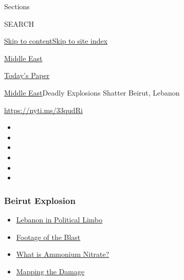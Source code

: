 Sections

SEARCH

\protect\hyperlink{site-content}{Skip to
content}\protect\hyperlink{site-index}{Skip to site index}

\href{https://www.nytimes3xbfgragh.onion/section/world/middleeast}{Middle
East}

\href{https://myaccount.nytimes3xbfgragh.onion/auth/login?response_type=cookie\&client_id=vi}{}

\href{https://www.nytimes3xbfgragh.onion/section/todayspaper}{Today's
Paper}

\href{/section/world/middleeast}{Middle East}\textbar{}Deadly Explosions
Shatter Beirut, Lebanon

\url{https://nyti.ms/33qudRi}

\begin{itemize}
\item
\item
\item
\item
\item
\item
\end{itemize}

\hypertarget{beirut-explosion}{%
\subsubsection{Beirut Explosion}\label{beirut-explosion}}

\begin{itemize}
\tightlist
\item
  \href{https://www.nytimes3xbfgragh.onion/2020/08/11/world/middleeast/lebanon-government-resigns-explainer.html?name=styln-beirut\&region=TOP_BANNER\&block=storyline_menu_recirc\&action=click\&pgtype=Article\&impression_id=b4d6dc20-f1c6-11ea-ab9d-b3a5fe44f351\&variant=undefined}{Lebanon
  in Political Limbo}
\item
  \href{https://www.nytimes3xbfgragh.onion/2020/08/05/world/middleeast/beirut-explosion-footage.html?name=styln-beirut\&region=TOP_BANNER\&block=storyline_menu_recirc\&action=click\&pgtype=Article\&impression_id=b4d6dc21-f1c6-11ea-ab9d-b3a5fe44f351\&variant=undefined}{Footage
  of the Blast}
\item
  \href{https://www.nytimes3xbfgragh.onion/2020/08/05/world/middleeast/beirut-explosion-ammonium-nitrate.html?name=styln-beirut\&region=TOP_BANNER\&block=storyline_menu_recirc\&action=click\&pgtype=Article\&impression_id=b4d70330-f1c6-11ea-ab9d-b3a5fe44f351\&variant=undefined}{What
  is Ammonium Nitrate?}
\item
  \href{https://www.nytimes3xbfgragh.onion/interactive/2020/08/04/world/middleeast/beirut-explosion-damage.html?name=styln-beirut\&region=TOP_BANNER\&block=storyline_menu_recirc\&action=click\&pgtype=Article\&impression_id=b4d70331-f1c6-11ea-ab9d-b3a5fe44f351\&variant=undefined}{Mapping
  the Damage}
\end{itemize}

